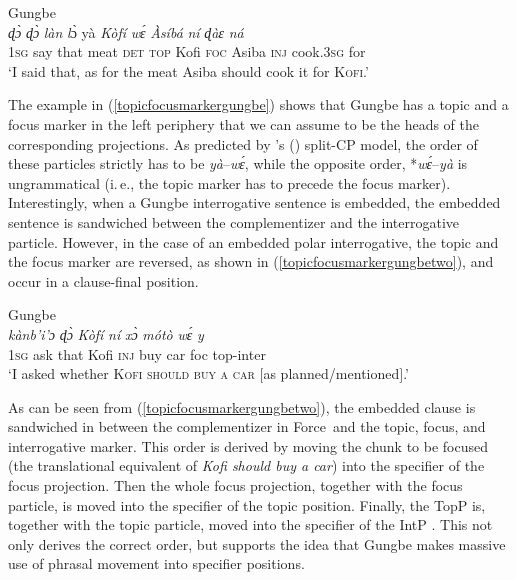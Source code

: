 \begin{exe}
\ex Gungbe \citep[168]{aboh2004left} \\ { {\textit{ɖɔ̀}} {\textit{ɖɔ̀}} {\textit{làn}} {\textit{l}ɔ̀} {yà} {\textit{Kòfí}} {\textit{wɛ́}} {\textit{Àsíbá}} {\textit{ní}} {\textit{ɖ}\textit{àɛ}} {\textit{n\'{a}}}  \\
{1\textsc{sg}} {say} {that} {meat} {\textsc{det}} {\textsc{top}} {Kofi} {\textsc{foc}} {Asiba} {\textsc{inj}} {cook.\textsc{3sg}} {for} \\
\trans `I said that, as for the meat Asiba should cook it for \textsc{Kofi}.' \label{topicfocusmarkergungbe} }
\end{exe}

\noindent The example in (\ref{topicfocusmarkergungbe}) shows that Gungbe has a topic and a focus marker in the left periphery that we can assume to be the heads of the corresponding projections. As predicted by \citeauthor{rizzi1997fine}'s (\citeyear{rizzi1997fine}) split-CP model, the order of these particles strictly has to be \textit{yà}--\textit{wɛ́}, while the opposite order, *\textit{wɛ́}--\textit{yà} is ungrammatical (i.\,e., the topic marker has to precede the focus marker). Interestingly, when a Gungbe interrogative sentence is embedded, the embedded sentence is sandwiched between the complementizer and the interrogative particle. However, in the case of an embedded polar interrogative, the topic and the focus marker are reversed, as shown in (\ref{topicfocusmarkergungbetwo}), and occur in a clause-final position. 

\begin{exe}
\ex Gungbe \citep[184]{aboh2004left} \\ { {\textit{kànb'{i}'{ɔ}}} {\textit{ɖɔ̀}} {\textit{Kòfí}} {\textit{ní}} {\textit{xɔ̀}} {\textit{mótò}} {\textit{wɛ́}} {\textit{y}}  \\
{1\textsc{sg}} {ask} {that} {Kofi} {\textsc{inj}} {buy} {car} {foc} {top-inter}  \\
\trans `I asked whether \textsc{Kofi should buy a car} $[$as planned/mentioned$]$.' \label{topicfocusmarkergungbetwo} }
\end{exe}


\noindent As can be seen from (\ref{topicfocusmarkergungbetwo}), the embedded clause is sandwiched in between the complementizer in Force\textdegree\ and the topic, focus, and interrogative marker. This order is derived by moving the chunk to be focused (the translational equivalent of \textit{Kofi should buy a car}) into the specifier of the focus projection. Then the whole focus projection, together with the focus particle, is moved into the specifier of the topic position. Finally, the TopP is, together with the topic particle, moved into the specifier of the IntP \citep[184]{aboh2004left}. This not only derives the correct order, but supports the idea that Gungbe makes massive use of phrasal movement into specifier positions.

